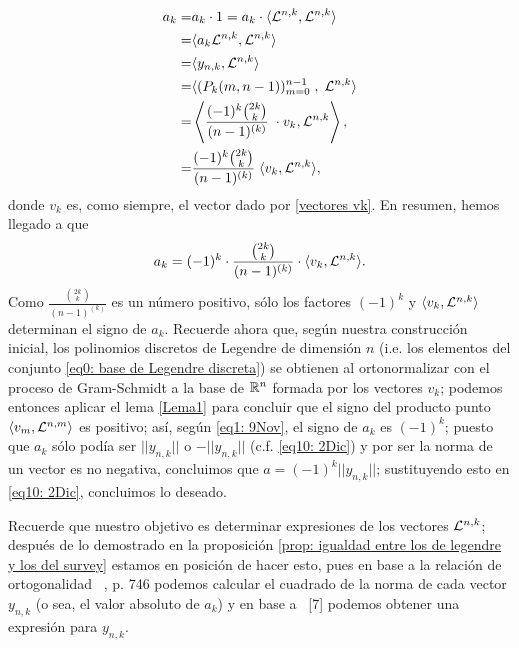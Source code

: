 \begin{align*}
a_{k}= & a_{k} \cdot 1 = 
a_{k} 
\cdot  \langle  \mathcal{L}^{n,k} , \mathcal{L}^{n,k} \rangle \\
= & \langle a_{k} \mathcal{L}^{n,k} , \mathcal{L}^{n,k} \rangle \\
= & \langle y_{n,k} , \mathcal{L}^{n,k} \rangle \\
= & \langle (P_{k}(m, n-1))_{m=0}^{n-1} 
\hspace{0.1cm}, \hspace{0.1cm} \mathcal{L}^{n,k} \rangle \\
= &
\left\langle
\frac{(-1)^{k}\binom{2k}{k}}{(n-1)^{(k)}} \hspace{0.1cm} \cdot
v_{k} , \mathcal{L}^{n,k}
\right\rangle, \\
= & \frac{(-1)^{k}\binom{2k}{k}}{(n-1)^{(k)}} \hspace{0.1cm}
\langle v_{k} , \mathcal{L}^{n,k} \rangle ,
\end{align*}
donde $v_{k}$ es,
como siempre, el vector 
dado por \eqref{vectores vk}.
En resumen, hemos llegado a que
\begin{equation}
\label{eq1: 9Nov}
a_{k}= (-1)^{k}\cdot 
\frac{\binom{2k}{k}}{(n-1)^{(k)}}\cdot 
\langle v_{k} , \mathcal{L}^{n,k}
\rangle.
\end{equation}
Como $\frac{\binom{2k}{k}}{(n-1)^{(k)}}$
es un número positivo, sólo los factores $(-1)^{k}$ y 
$\langle v_{k} , \mathcal{L}^{n,k} \rangle$
determinan el signo de $a_{k}$.
\noindent 
Recuerde ahora que,
según nuestra construcción inicial,
los polinomios discretos de Legendre
de dimensión $n$ (i.e.
los elementos del conjunto 
\eqref{eq0: base de Legendre discreta}) 
se obtienen 
al ortonormalizar con el proceso
de Gram-Schmidt a la base 
de $\mathbb{R}^{n}$ formada por
los vectores $v_{k}$; 
podemos entonces aplicar el lema \ref{Lema1} para 
concluir que el signo del producto punto 
$\langle v_{m} , \mathcal{L}^{n,m} \rangle$
es positivo; así,
según \eqref{eq1: 9Nov},
el signo de $a_{k}$ 
es $(-1)^{k}$;
puesto que $a_{k}$ sólo podía ser
$||y_{n,k}||$ o $-||y_{n,k}||$ 
(c.f. \eqref{eq10: 2Dic})
y por ser la norma
de un vector es no negativa, concluimos que
$a=(-1)^{k}||y_{n,k}||$; sustituyendo esto en
\eqref{eq10: 2Dic},
concluimos lo deseado.
\\
\QEDB
\vspace{0.2cm}


\noindent 

Recuerde que nuestro objetivo es determinar expresiones
de los vectores $\mathcal{L}^{n,k}$; 
después de lo demostrado en 
la proposición
\ref{prop: igualdad entre los de legendre y los del survey}
estamos en posición de hacer esto, pues
en base a la relación de ortogonalidad 
~\cite{Neuman}, p. 746
podemos calcular el cuadrado
de la norma de cada vector $y_{n,k}$ (o sea,
el valor absoluto de $a_{k}$)
y  en base a 
~\cite{Neuman}[7]
podemos
obtener una expresión para $y_{n,k}$.

